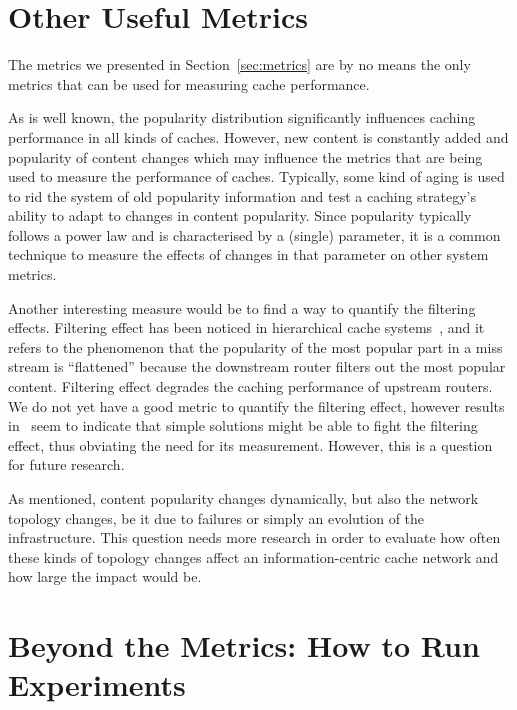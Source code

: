 \documentclass{sigcomm-alternate}
\begin{document}
\section{Other Useful Metrics}
\label{sec:other}

The metrics we presented in Section~\ref{sec:metrics} are by no means the only metrics that can be used for measuring cache performance.



As is well known, the popularity distribution significantly influences caching performance in all kinds of caches.
However, new content is constantly added and popularity of content changes which may influence the metrics that are being used to measure the performance of caches.
Typically, some kind of aging is used to rid the system of old popularity information and test a caching strategy's ability to adapt to changes in content popularity.
Since popularity typically follows a power law and is characterised by a (single) parameter, it is a common technique to measure the effects of changes in that parameter on other system metrics.





Another interesting measure would be to find a way to quantify the filtering effects.
Filtering effect has been noticed in hierarchical cache systems~\cite{Williamson:2002:FEW}, and it refers to the phenomenon that the popularity of the most popular part in a miss stream is ``flattened'' because the downstream router filters out the most popular content.
Filtering effect degrades the caching performance of upstream routers.
We do not yet have a good metric to quantify the filtering effect, however results in~\cite{wong:globecom2012} seem to indicate that simple solutions might be able to fight the filtering effect, thus obviating the need for its measurement.
However, this is a question for future research.



As mentioned, content popularity changes dynamically, but also the network topology changes, be it due to failures or simply an evolution of the infrastructure.
This question needs more research in order to evaluate how often these kinds of topology changes affect an information-centric cache network and how large the impact would be.









\section{Beyond the Metrics: How to Run Experiments}
\label{sec:exp}
\end{document}

